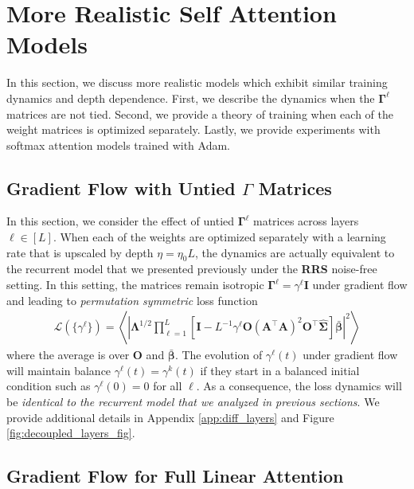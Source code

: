 \documentclass{article} %
\begin{document}
\section{More Realistic Self Attention Models}
\vspace{-5pt}
In this section, we discuss more realistic models which exhibit similar training dynamics and depth dependence. First, we describe the dynamics when the $\bm\Gamma^\ell$ matrices are not tied. Second, we provide a theory of training when each of the weight matrices is optimized separately. Lastly, we provide experiments with softmax attention models trained with Adam.
\vspace{-5pt}
\subsection{Gradient Flow with Untied $\Gamma$ Matrices}\label{sec:untied_gammas}

In this section, we consider the effect of untied $\bm\Gamma^\ell$ matrices across layers $\ell \in [L]$. When each of the weights are optimized separately with a learning rate that is upscaled by depth $\eta = \eta_0 L$, the dynamics are actually equivalent to the recurrent model that we presented previously under the \textbf{RRS} noise-free setting. In this setting, the matrices remain isotropic $\bm\Gamma^\ell = \gamma^\ell \bm I$ under gradient flow and leading to \textit{permutation symmetric} loss function
\begin{align}
    \mathcal L(\{ \gamma^\ell \}) = \left< \left|\bm\Lambda^{1/2} \prod_{\ell=1}^L \left[ \bm I - L^{-1} \gamma^\ell \bm O \left( \bm A^\top \bm A \right)^2 \bm O^\top \hat{\bm\Sigma}  \right] \bar{\bm\beta} \right|^2 \right>
\end{align}
where the average is over $\bm O$ and $\bar{\bm\beta}$. The evolution of $\gamma^\ell(t)$ under gradient flow will maintain balance $\gamma^\ell(t) = \gamma^k(t)$ if they start in a balanced initial condition such as $\gamma^\ell(0)=0$ for all $\ell$. As a consequence, the loss dynamics will be \textit{identical to the recurrent model that we analyzed in previous sections}. We provide additional details in Appendix \ref{app:diff_layers} and Figure \ref{fig:decoupled_layers_fig}. 

\vspace{-5pt}
\subsection{Gradient Flow for Full Linear Attention}\label{sec:full_linear_att_dynamics}
\end{document}
